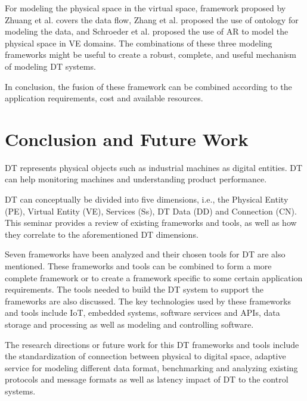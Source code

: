 \documentclass[article,table]{aaltoseries}
\begin{document}
For modeling the physical space in the virtual space, framework proposed by Zhuang et al. \cite{Zhuang2018} covers the data flow, Zhang et al. \cite{Zhang2017} proposed the use of ontology for modeling the data, and Schroeder et al. \cite{schroeder2016visualising} proposed the use of AR to model the physical space in VE domains. The combinations of these three modeling frameworks might be useful to create a robust, complete, and useful mechanism of modeling DT systems.

In conclusion, the fusion of these framework can be combined according to the application requirements, cost and available resources. 

\section{Conclusion and Future Work}
DT represents physical objects such as industrial machines as digital entities. DT can help monitoring machines and understanding product performance.

DT can conceptually be divided into five dimensions, i.e., the Physical Entity (PE), Virtual Entity (VE), Services (Ss), DT Data (DD) and Connection (CN). This seminar provides a review of existing frameworks and tools, as well as how they correlate to the aforementioned DT dimensions.

Seven frameworks have been analyzed and their chosen tools for DT are also mentioned. These frameworks and tools can be combined to form a more complete framework or to create a framework specific to some certain application requirements. The tools needed to build the DT system to support the frameworks are also discussed. The key technologies used by these frameworks and tools include IoT, embedded systems, software services and APIs, data storage and processing as well as modeling and controlling software.

The research directions or future work for this DT frameworks and tools include the standardization of connection between physical to digital space, adaptive service for modeling different data format, benchmarking and analyzing existing protocols and message formats as well as latency impact of DT to the control systems.

 




\end{document}
